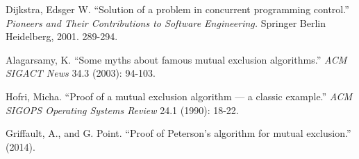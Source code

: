 \documentclass[a4paper,onecolumn,oneside]{article}
\begin{document}
\clearpage

\begin{thebibliography}{32}

 Dijkstra, Edsger W. ``Solution of a problem in concurrent
programming control.'' \emph{Pioneers and Their Contributions to Software
Engineering.} Springer Berlin Heidelberg, 2001. 289-294.

 Alagarsamy, K. ``Some myths about famous mutual
exclusion algorithms.'' \emph{ACM SIGACT News} 34.3 (2003): 94-103.

 Hofri, Micha. ``Proof of a mutual exclusion algorithm --- a
classic example.'' \emph{ACM SIGOPS Operating Systems Review} 24.1 (1990):
18-22.

 Griffault, A., and G. Point. ``Proof of Peterson’s
algorithm for mutual exclusion.'' (2014).

\end{thebibliography}
\end{document}
